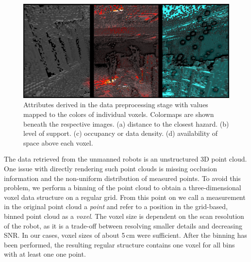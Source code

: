 \documentclass[conference,10pt,letter]{IEEEtran}
\begin{document}
\begin{figure}
	\centering
	\includegraphics[width=\columnwidth]{figures/fig-overview-fields-small.png}
	\caption{Attributes derived in the data preprocessing stage with values mapped to the colors of individual voxels. Colormaps are shown beneath the respective images. (a) distance to the closest hazard. (b) level of support. (c) occupancy or data density. (d) availability of space above each voxel.}
    \label{fig:overview:precomputation}
\end{figure}

 The data retrieved from the unmanned robots is an unstructured 3D point cloud. One issue with directly rendering such point clouds is missing occlusion information and the non-uniform distribution of measured points. To avoid this problem, we perform a binning of the point cloud to obtain a three-dimensional voxel data structure on a regular grid. From this point on we call a measurement in the original point cloud a \emph{point} and refer to a position in the grid-based, binned point cloud as a \emph{voxel}. The voxel size is dependent on the scan resolution of the robot, as it is a trade-off between resolving smaller details and decreasing SNR. In our cases, voxel sizes of about 5\,cm were sufficient. After the binning has been performed, the resulting regular structure contains one voxel for all bins with at least one one point.
\end{document}
